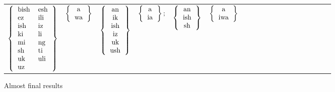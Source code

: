 \documentclass[output=paper,colorlinks,citecolor=brown]{langscibook}
\begin{document}
   
\begin{figure}
\begin{tabular}{lllllllllllllllllll} 
$ \left\{ \begin{tabular}{ll} bish &  esh     \\ ez  &  ili \\ ish  & iz \\ki  & li\\mi & ng\\sh  &  ti\\ uk  &  uli \\ uz \end{tabular} \right\} $& $\left\{ \begin{tabular}{c}  a \\ wa \end{tabular} \right\}  $  &
$ \left\{ \begin{tabular}{c}  an     \\ ik \\ ish \\ iz \\ uk \\ush  \end{tabular} \right\} $&$ \left\{ \begin{tabular}{c}  a \\ ia \end{tabular} \right\}   ;$ &
$ \left\{ \begin{tabular}{c}  an     \\ ish \\ sh    \end{tabular} \right\} $& $\left\{ \begin{tabular}{c}  a \\ iwa \end{tabular} \right\} $   \\
\end{tabular}
\caption{Almost final results}
\label{finalsigs1}
\end{figure}
\end{document}
